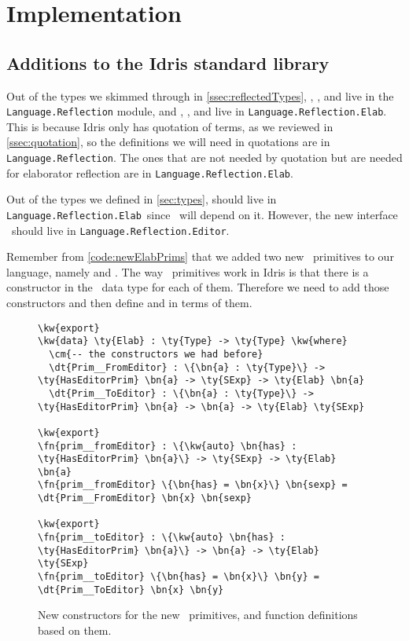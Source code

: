 \chapter{Implementation}\label{chap:implementation}

\section{Additions to the Idris standard library}\label{sec:stdlib}

\newcommand{\LR}{\texttt{Language.Reflection}}
\newcommand{\LRE}{\texttt{Language.Reflection.Elab}}
\newcommand{\LREd}{\texttt{Language.Reflection.Editor}}

Out of the types we skimmed through in \autoref{ssec:reflectedTypes}, \TT,
\Raw, and  live in the \texttt{Language.Reflection} module, and
, , and  live in \LRE. This is because
Idris only has quotation of terms, as we reviewed in \autoref{ssec:quotation},
so the definitions we will need in quotations are in \LR. The ones that are not
needed by quotation but are needed for elaborator reflection are in \LRE.

Out of the types we defined in \autoref{sec:types},  should live in
\LRE\ since \Elab\ will depend on it. However, the new interface
\Editorable\ should live in \LREd.

Remember from \autoref{code:newElabPrims} that we added two new
\Elab\ primitives to our language, namely  and
.
The way \Elab\ primitives work in Idris is that there is a constructor in the
\Elab\ data type for each of them. Therefore we need to add those constructors
and then define  and  in terms of
them.

\begin{figure}[ht]
\caption{New constructors for the new \Elab\ primitives, and function definitions based on them.}
  \label{code:newElabConstructors}
\begin{Verbatim}[framesep=2mm, label=\footnotesize{\normalfont{Idris}}, labelposition=topline]
\kw{export}
\kw{data} \ty{Elab} : \ty{Type} -> \ty{Type} \kw{where}
  \cm{-- the constructors we had before}
  \dt{Prim__FromEditor} : \{\bn{a} : \ty{Type}\} -> \ty{HasEditorPrim} \bn{a} -> \ty{SExp} -> \ty{Elab} \bn{a}
  \dt{Prim__ToEditor} : \{\bn{a} : \ty{Type}\} -> \ty{HasEditorPrim} \bn{a} -> \bn{a} -> \ty{Elab} \ty{SExp}

\kw{export}
\fn{prim__fromEditor} : \{\kw{auto} \bn{has} : \ty{HasEditorPrim} \bn{a}\} -> \ty{SExp} -> \ty{Elab} \bn{a}
\fn{prim__fromEditor} \{\bn{has} = \bn{x}\} \bn{sexp} = \dt{Prim__FromEditor} \bn{x} \bn{sexp}

\kw{export}
\fn{prim__toEditor} : \{\kw{auto} \bn{has} : \ty{HasEditorPrim} \bn{a}\} -> \bn{a} -> \ty{Elab} \ty{SExp}
\fn{prim__toEditor} \{\bn{has} = \bn{x}\} \bn{y} = \dt{Prim__ToEditor} \bn{x} \bn{y}
\end{Verbatim}
\end{figure}


